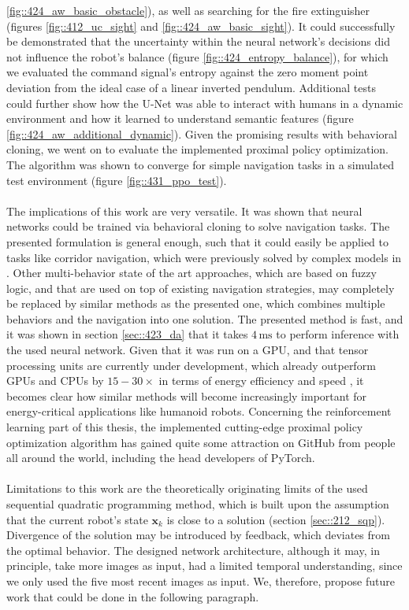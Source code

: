 \ref{fig::424_aw_basic_obstacle}), as well as searching for the fire extinguisher (figures \ref{fig::412_uc_sight} and \ref{fig::424_aw_basic_sight}). It could successfully be demonstrated that the uncertainty within the neural network's decisions did not influence the robot's balance (figure \ref{fig::424_entropy_balance}), for which we evaluated the command signal's entropy against the zero moment point deviation from the ideal case of a linear inverted pendulum. Additional tests could further show how the U-Net was able to interact with humans in a dynamic environment and how it learned to understand semantic features (figure \ref{fig::424_aw_additional_dynamic}). Given the promising results with behavioral cloning, we went on to evaluate the implemented proximal policy optimization. The algorithm was shown to converge for simple navigation tasks in a simulated test environment (figure \ref{fig::431_ppo_test}).
\\\\
The implications of this work are very versatile. It was shown that neural networks could be trained via behavioral cloning to solve navigation tasks. The presented formulation is general enough, such that it could easily be applied to tasks like corridor navigation, which were previously solved by complex models in \cite{faragasso2013vision}. Other multi-behavior state of the art approaches, which are based on fuzzy logic, and that are used on top of existing navigation strategies, may completely be replaced by similar methods as the presented one, which combines multiple behaviors and the navigation into one solution. The presented method is fast, and it was shown in section \ref{sec::423_da} that it takes $4\,\text{ms}$ to perform inference with the used neural network. Given that it was run on a GPU, and that tensor processing units are currently under development, which already outperform GPUs and CPUs by $15-30\times$ in terms of energy efficiency and speed \cite{jouppi2017datacenter}, it becomes clear how similar methods will become increasingly important for energy-critical applications like humanoid robots. Concerning the reinforcement learning part of this thesis, the implemented cutting-edge proximal policy optimization algorithm has gained quite some attraction on GitHub from people all around the world, including the head developers of PyTorch.
\\\\
Limitations to this work are the theoretically originating limits of the used sequential quadratic programming method, which is built upon the assumption that the current robot's state $\bm{x}_k$ is close to a solution (section \ref{sec::212_sqp}). Divergence of the solution may be introduced by feedback, which deviates from the optimal behavior. The designed network architecture, although it may, in principle, take more images as input, had a limited temporal understanding, since we only used the five most recent images as input. We, therefore, propose future work that could be done in the following paragraph.

